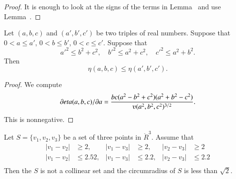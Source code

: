 \begin{tarskidata}
\begin{tarski}

\begin{proof} It is enough to look at the signs of the terms in
Lemma~ and use Lemma~.
\end{proof}
\end{tarski}





\begin{tarski}

\begin{lemma}
Let $(a,b,c)$ and $(a',b',c')$ be two triples of real numbers.
Suppose that $0 < a\le a'$, $0 < b\le b'$, $0< c\le c'$.  Suppose that
   $$
   a'^2 \le b^2 + c^2,\quad b'^2 \le a^2 + c^2,\quad c'^2\le a^2 + b^2.
   $$
Then
   $$
   \eta(a,b,c) \le \eta(a',b',c').
   $$
\end{lemma}


\begin{proof} We compute
	$$\partial\eta(a,b,c)/\partial a = 
        \frac{b c (a^2 - b^2 + c^2)(a^2 + b^2 - c^2)}{\ups(a^2,b^2,c^2)^{3/2}}.
	$$
This is nonnegative.  
\end{proof}
\end{tarski}





\begin{tarski}

\begin{lemma}
Let $S=\{v_1,v_2,v_3\}$ be a set of three points in $\ring{R}^3$.
Assume that
	$$
	\begin{array}{rlrlrl}
	|v_1-v_2|&\ge 2,  &|v_1-v_3|&\ge 2,   &|v_2-v_3|&\ge 2\\
	|v_1-v_2|&\le 2.52, &|v_1-v_3|&\le 2.2, &|v_2-v_3|&\le 2.2\\
	\end{array}
	$$
Then the $S$ is not a collinear set and the circumradius of 
$S$ is less than $\sqrt2$.
\end{lemma}


\end{tarski}
\end{tarskidata}
